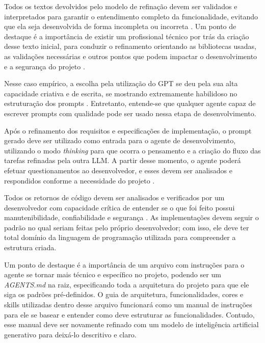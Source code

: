 Todos os textos devolvidos pelo modelo de refinação devem ser validados e interpretados para garantir o entendimento completo da funcionalidade, evitando que ela seja desenvolvida de forma incompleta ou incorreta \cite{tolio_llms_2026}. Um ponto de destaque é a importância de existir um profissional técnico por trás da criação desse texto inicial, para conduzir o refinamento orientando as bibliotecas usadas, as validações necessárias e outros pontos que podem impactar o desenvolvimento e a segurança do projeto \cite{ciudrowski2026explorando, palermo_agentes_2026}.

Nesse caso empírico, a escolha pela utilização do GPT se deu pela sua alta capacidade criativa e de escrita, se mostrando extremamente habilidoso no estruturação dos prompts \cite{minaee_large_2024}. Entretanto, entende-se que qualquer agente capaz de escrever prompts com qualidade pode ser usado nessa etapa de desenvolvimento.

Após o refinamento dos requisitos e especificações de implementação, o prompt gerado deve ser utilizado como entrada para o agente de desenvolvimento, utilizando o modo \textit{thinking} para que ocorra o pensamento e a criação do fluxo das tarefas refinadas pela outra LLM. A partir desse momento, o agente poderá efetuar questionamentos ao desenvolvedor, e esses devem ser analisados e respondidos conforme a necessidade do projeto \cite{minaee_large_2024}.

Todos os retornos de código devem ser analisados e verificados por um desenvolvedor com capacidade crítica de entender se o que foi feito possui manutenibilidade, confiabilidade e segurança \cite{ciudrowski2026explorando, palermo_agentes_2026}. As implementações devem seguir o padrão no qual seriam feitas pelo próprio desenvolvedor; com isso, ele deve ter total domínio da linguagem de programação utilizada para compreender a estrutura criada.

Um ponto de destaque é a importância de um arquivo com instruções para o agente se tornar mais técnico e específico no projeto, podendo ser um \textit{AGENTS.md} na raiz, especificando toda a arquitetura do projeto para que ele siga os padrões pré-definidos. O guia de arquitetura, funcionalidades, cores e skills utilizadas dentro desse arquivo funcionará como um manual de instruções para ele se basear e entender como deve estruturar as funcionalidades. Contudo, esse manual deve ser novamente refinado com um modelo de inteligência artificial generativo para deixá-lo descritivo e claro.

